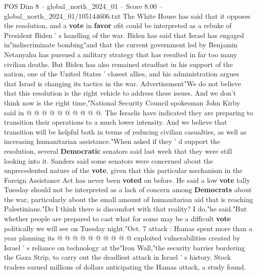 \begin{textsample}{POS Dim 8 – global\_north\_2024\_01 – Score 8.00 – global\_north\_2024\_01/105144606.txt}
The White House has said that it opposes the resolution, and a \textbf{vote} in \textbf{favor} ofit could be interpreted as a rebuke of President Biden ' s handling of the war.
Biden has said that Israel has engaged in"indiscriminate bombing"and that the current government led by Benjamin Netanyahu has pursued a military strategy that has resulted in far too many civilian deaths.
But Biden has also remained steadfast in his support of the nation, one of the United States ' closest allies, and his administration argues that Israel is changing its tactics in the war.
Advertisement"We do not believe that this resolution is the right vehicle to address these issues.
And we don't think now is the right time,"National Security Council spokesman John Kirby said in @ @ @ @ @ @ @ @ @ @.
The Israelis have indicated they are preparing to transition their operations to a much lower intensity.
And we believe that transition will be helpful both in terms of reducing civilian casualties, as well as increasing humanitarian assistance."When asked if they ' d support the resolution, several \textbf{Democratic} senators said last week that they were still looking into it.
Sanders said some senators were concerned about the unprecedented nature of the \textbf{vote}, given that this particular mechanism in the Foreign Assistance Act has never been \textbf{voted} on before.
He said a low \textbf{vote} tally Tuesday should not be interpreted as a lack of concern among \textbf{Democrats} about the war, particularly about the small amount of humanitarian aid that is reaching Palestinians."Do I think there is discomfort with that reality?
I do,"he said."But whether people are prepared to cast what for some may be a difficult \textbf{vote} politically we will see on Tuesday night."Oct. 7 attack : Hamas spent more than a year planning its @ @ @ @ @ @ @ @ @ @ exploited vulnerabilities created by Israel ' s reliance on technology at the"Iron Wall,"the security barrier bordering the Gaza Strip, to carry out the deadliest attack in Israel ' s history.
Stock traders earned millions of dollars anticipating the Hamas attack, a study found.

\end{textsample}

